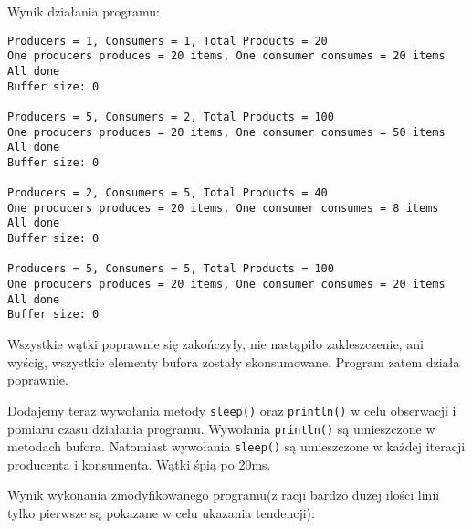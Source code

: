 \documentclass[11pt]{article}
\begin{document}
Wynik działania programu:

\begin{tcolorbox}
\begin{Verbatim}
Producers = 1, Consumers = 1, Total Products = 20
One producers produces = 20 items, One consumer consumes = 20 items
All done
Buffer size: 0

Producers = 5, Consumers = 2, Total Products = 100
One producers produces = 20 items, One consumer consumes = 50 items
All done
Buffer size: 0

Producers = 2, Consumers = 5, Total Products = 40
One producers produces = 20 items, One consumer consumes = 8 items
All done
Buffer size: 0

Producers = 5, Consumers = 5, Total Products = 100
One producers produces = 20 items, One consumer consumes = 20 items
All done
Buffer size: 0
\end{Verbatim}


\end{tcolorbox}Wszystkie wątki poprawnie się zakończyły, nie nastąpiło zakleszczenie, ani
wyścig, wszystkie elementy bufora zostały skonsumowane. Program zatem działa
poprawnie.

Dodajemy teraz wywołania metody \texttt{sleep()} oraz \texttt{println()} w celu obserwacji i pomiaru
czasu działania programu.
Wywołania \texttt{println()} są umieszczone w metodach bufora.
Natomiast wywołania \texttt{sleep()} są umieszczone w każdej iteracji producenta i konsumenta.
Wątki śpią po 20ms.

Wynik wykonania zmodyfikowanego programu(z racji bardzo dużej ilości linii
tylko
pierwsze są pokazane w celu ukazania tendencji):
\end{document}
